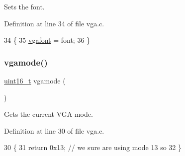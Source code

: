 Sets the font. 



Definition at line 34 of file vga.\+c.


\begin{DoxyCode}
34                                   \{
35     \hyperlink{a00014_a586c0ac088deb9338d9b1464dcd587c8_a586c0ac088deb9338d9b1464dcd587c8}{vgafont} = font;
36 \}
\end{DoxyCode}
\mbox{\label{a00017_af6d170c9401ea8f94d4c5cf09347cca7_af6d170c9401ea8f94d4c5cf09347cca7}} 
\subsubsection{\texorpdfstring{vgamode()}{vgamode()}}
{\footnotesize\ttfamily \hyperlink{a00092_a273cf69d639a59973b6019625df33e30_a273cf69d639a59973b6019625df33e30}{uint16\+\_\+t} vgamode (\begin{DoxyParamCaption}{ }\end{DoxyParamCaption})}



Gets the current V\+GA mode. 



Definition at line 30 of file vga.\+c.


\begin{DoxyCode}
30                    \{
31     \textcolor{keywordflow}{return} 0x13; \textcolor{comment}{// we sure are using mode 13 so}
32 \}
\end{DoxyCode}
